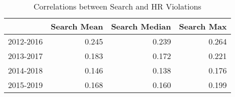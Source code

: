 \begin{table}[ht]
\centering
\begin{tabular}{|l|rrr|}
  \hline
 & Search Mean & Search Median & Search Max \\ 
  \hline
2012-2016 & 0.245 & 0.239 & 0.264 \\ 
  2013-2017 & 0.183 & 0.172 & 0.221 \\ 
  2014-2018 & 0.146 & 0.138 & 0.176 \\ 
  2015-2019 & 0.168 & 0.160 & 0.199 \\ 
   \hline
\end{tabular}
\caption{Correlations between Search and HR Violations} 
\end{table}
